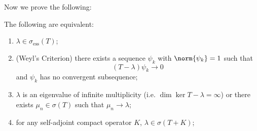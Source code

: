 \documentclass[12pt]{article}
\newcommand{\ess}{\sigma_{\text{ess}}}
\begin{document}
Now we prove the following:
\begin{thm}The following are equivalent:
\begin{enumerate}[label = (\roman*)]
\item $\lambda \in \ess(T)$;
\item (Weyl's Criterion) there exists a sequence $\psi_k$ with $\norm{\psi_k} = 1$ such that
\[(T-\lambda)\psi_k \to 0\] and $\psi_k$ has no convergent subsequence;
\item $\lambda$ is an eigenvalue of infinite multiplicity (i.e. $\dim \ker T-\lambda = \infty$) or there exists $\mu_n \in \sigma(T)$ such that $\mu_n \to \lambda$;
\item for any self-adjoint compact operator $K$, $\lambda \in \sigma(T+K)$;
\end{enumerate}
\end{thm}
\end{document}
